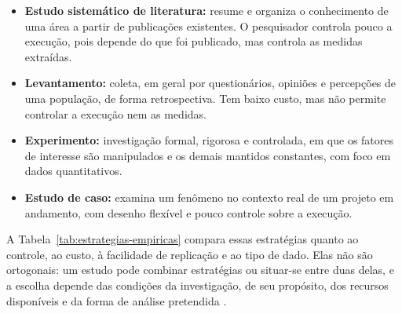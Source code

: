 \begin{itemize}
	\item \textbf{Estudo sistemático de literatura:} resume e organiza o
	      conhecimento de uma área a partir de publicações existentes. O
	      pesquisador controla pouco a execução, pois depende do que foi
	      publicado, mas controla as medidas extraídas.
	\item \textbf{Levantamento:} coleta, em geral por questionários, opiniões e
	      percepções de uma população, de forma retrospectiva. Tem baixo custo,
	      mas não permite controlar a execução nem as medidas.
	\item \textbf{Experimento:} investigação formal, rigorosa e controlada, em
	      que os fatores de interesse são manipulados e os demais mantidos
	      constantes, com foco em dados quantitativos.
	\item \textbf{Estudo de caso:} examina um fenômeno no contexto real de um
	      projeto em andamento, com desenho flexível e pouco controle sobre a
	      execução.
\end{itemize}

A Tabela~\ref{tab:estrategias-empiricas} compara essas estratégias quanto ao
controle, ao custo, à facilidade de replicação e ao tipo de dado. Elas não são
ortogonais: um estudo pode combinar estratégias ou situar-se entre duas
delas, e a escolha depende das condições da investigação, de seu propósito,
dos recursos disponíveis e da forma de análise pretendida
\cite{wohlin2024}.


